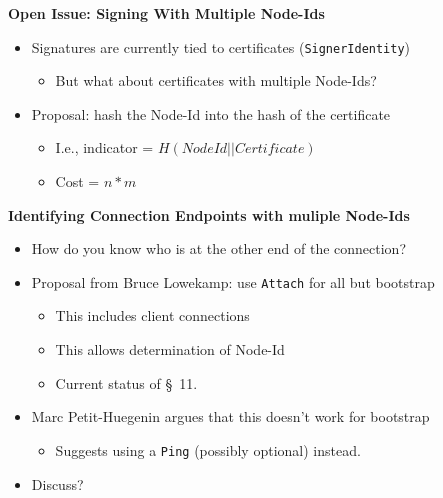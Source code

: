 \documentclass[helvetica]{seminar}
\newcommand{\heading}[1]{%
  \begin{center} 
    \large\bf 
    #1 
  \end{center} 
  \vspace{.4 in}}
\begin{document}
\begin{slide}
\heading{Open Issue: Signing With Multiple Node-Ids}

\begin{itemize}
\item Signatures are currently tied to certificates (\verb^SignerIdentity^)
  \begin{itemize}
  \item But what about certificates with multiple Node-Ids?
  \end{itemize}

\item Proposal: hash the Node-Id into the hash of the certificate
  \begin{itemize}
  \item I.e., indicator = $H(NodeId || Certificate)$
  \item Cost = $n * m$
  \end{itemize}
\end{itemize}
\end{slide}


\begin{slide}
\heading{Identifying Connection Endpoints with muliple Node-Ids}

\begin{itemize}
\item How do you know who is at the other end of the connection?
\end{itemize}
\begin{itemize}
\item Proposal from Bruce Lowekamp: use \verb^Attach^ for all but bootstrap
  \begin{itemize}
  \item This includes client connections
  \item This allows determination of Node-Id
  \item Current status of \S\ 11.
  \end{itemize}

\item Marc Petit-Huegenin argues that this doesn't work for bootstrap
  \begin{itemize}
  \item Suggests using a \verb^Ping^ (possibly optional) instead.
  \end{itemize}

\item Discuss?
\end{itemize}
\end{slide}
\end{document}

